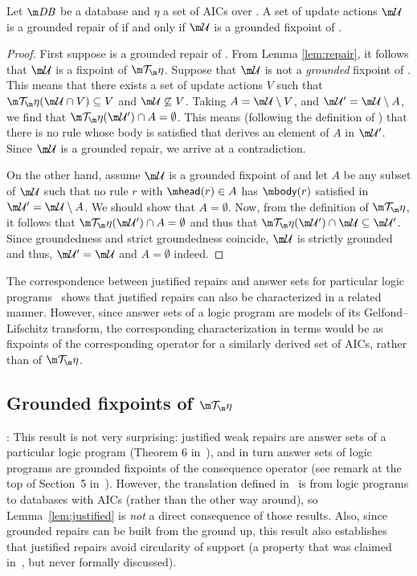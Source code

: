 \begin{lemma}
 Let $\db$ be a database and $\eta$ a set of AICs over \db. A set of update actions $\UU$ is a grounded repair of \fulldb if and only if $\UU$ is a grounded fixpoint of \Op. 
\end{lemma}
\begin{proof}
 First suppose \UU is a grounded repair of \fulldb. From Lemma \ref{lem:repair}, it follows that $\UU$ is a fixpoint of $\Op$. Suppose that $\UU$ is not a \emph{grounded} fixpoint of \Op. This means that there exists a set of update actions $V$ such that $\Op(\UU\cap V) \subseteq V$ and $\UU \not \subseteq V$. Taking $A=\UU\setminus V$, and $\UU'=\UU\setminus A$, we find that $\Op(\UU') \cap A = \emptyset$. This means (following the definition of \Op) that there is no rule whose body is satisfied  that derives an element of $A$ in $\UU'$. Since $\UU$ is a grounded repair, we arrive at a contradiction. 
 
 On the other hand, assume $\UU$ is a grounded fixpoint of \Op and let $A$ be any subset of $\UU$ such that no rule $r$ with $\head(r)\in A$ has $\body(r)$ satisfied in $\UU'=\UU\setminus A$. We should show that $A=\emptyset$. Now, from the definition of $\Op$, it follows that $\Op(\UU')\cap A=\emptyset$ and thus that $\Op(\UU') \cap \UU \subseteq \UU'$. Since groundedness and strict groundedness coincide, $\UU$ is strictly grounded and thus, $\UU'=\UU$ and $A=\emptyset$ indeed. 
\end{proof}







The correspondence between justified repairs and answer sets for particular logic programs~\cite{Caroprese2011} shows that justified repairs can also be characterized in a related manner.
However, since answer sets of a logic program are models of its Gelfond--Lifschitz transform, the corresponding characterization in terms would be as fixpoints of the corresponding operator for a similarly derived set of AICs, rather than of $\Op$.



\subsection{Grounded fixpoints of $\Op$}

:
This result is not very surprising: justified weak repairs are answer sets of a particular logic program (Theorem 6 in~\cite{Caroprese2011}), and in turn answer sets of logic programs are grounded fixpoints of the consequence operator (see remark at the top of Section~5 in~).
However, the translation defined in~\cite{Caroprese2011} is from logic programs to databases with AICs (rather than the other way around), so Lemma~\ref{lem:justified} is \emph{not} a direct consequence of those results.
Also, since grounded repairs can be built from the ground up, this result also establishes that justified repairs avoid circularity of support (a property that was claimed in~\cite{Caroprese2011}, but never formally discussed).



